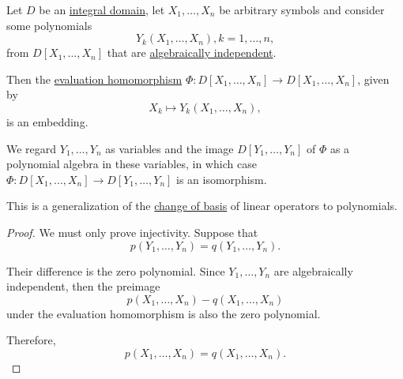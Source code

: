 \begin{proposition}\label{thm:change_of_polynomial_basis}
  Let \( D \) be an \hyperref[def:integral_domain]{integral domain}, let \( X_1, \ldots, X_n \) be arbitrary symbols and consider some polynomials
  \begin{equation*}
    Y_k(X_1, \ldots, X_n), k = 1, \ldots, n,
  \end{equation*}
  from \( D[X_1, \ldots, X_n] \) that are \hyperref[def:algebraic_dependence]{algebraically independent}.

  Then the \hyperref[thm:polynomial_algebra_universal_property]{evaluation homomorphism} \( \Phi: D[X_1, \ldots, X_n] \to D[X_1, \ldots, X_n] \), given by
  \begin{equation*}
    X_k \mapsto Y_k(X_1, \ldots, X_n),
  \end{equation*}
  is an embedding.

  We regard \( Y_1, \ldots, Y_n \) as variables and the image \( D[Y_1, \ldots, Y_n] \) of \( \Phi \) as a polynomial algebra in these variables, in which case \( \Phi: D[X_1, \ldots, X_n] \to D[Y_1, \ldots, Y_n] \) is an isomorphism.

  This is a generalization of the \hyperref[rem:change_of_basis]{change of basis} of linear operators to polynomials.
\end{proposition}
\begin{proof}
  We must only prove injectivity. Suppose that
  \begin{equation*}
    p(Y_1, \ldots, Y_n) = q(Y_1, \ldots, Y_n).
  \end{equation*}

  Their difference is the zero polynomial. Since \( Y_1, \ldots, Y_n \) are algebraically independent, then the preimage
  \begin{equation*}
    p(X_1, \ldots, X_n) - q(X_1, \ldots, X_n)
  \end{equation*}
  under the evaluation homomorphism is also the zero polynomial.

  Therefore,
  \begin{equation*}
    p(X_1, \ldots, X_n) = q(X_1, \ldots, X_n).
  \end{equation*}
\end{proof}
